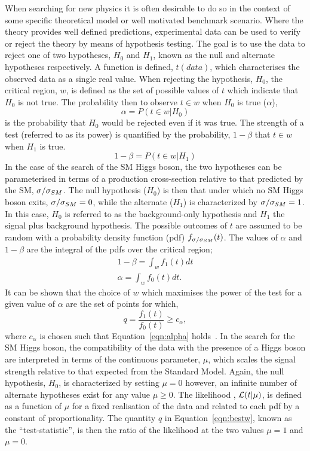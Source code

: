 When searching for new physics it is often desirable to do so in the context of
some specific theoretical model or well motivated benchmark scenario.
Where the theory provides well defined predictions,
experimental data can be used to verify or reject the theory
by means of hypothesis testing. The goal is to use the data 
to reject one of two hypotheses,
$H_{0}$ and $H_{1}$, known as the null and alternate hypotheses
respectively. A function is defined, $t(data)$,
which characterises the observed data as a single real value. When rejecting 
the hypothesis, $H_{0}$, the critical
region, $w$, is defined as the set of possible values of $t$
which indicate that $H_{0}$ is not true. The probability then 
to observe $t\in w$ when $H_{0}$ is true ($\alpha$), 
\begin{equation}
\alpha = P(t\in w|H_{0})
\end{equation}
is the probability that $H_{0}$ would be rejected even if it was true.
The strength of a test (referred to as its power) is quantified by 
the probability, $1-\beta$ that $t \in  w$ when $H_{1}$ is true.
\begin{equation}
1-\beta = P(t\in w|H_{1})
\end{equation}
In the case of the search of the SM Higgs boson, the two hypotheses
can be parameterised in terms of a production cross-section relative
to that predicted by the SM, $\sigma/\sigma_{SM}$.  
The null hypothesis ($H_{0}$) is then that under which no SM Higgs boson exits,
$\sigma/\sigma_{SM}=0$, while the alternate ($H_{1}$) is characterized by $\sigma/\sigma_{SM}=1$.
In this case, $H_{0}$ is referred to as the background-only hypothesis
and $H_{1}$ the signal plus background hypothesis.
The possible outcomes of $t$ are assumed to be random with a probability density
function (pdf) $f_{\sigma/\sigma_{SM}}(t)$. The values of $\alpha$ and $1-\beta$ are the integral of the pdfs
over the critical region;
\begin{eqnarray}
1-\beta =  \int_{w}f_{1}(t)dt\\ 
\alpha =  \int_{w}f_{0}(t)dt.
\label{eqn:alpha}
\end{eqnarray}
It can be shown that the choice of $w$ which maximises the power of the test for 
a given value of $\alpha$ are the set of points for which,
\begin{equation} 
	q = \frac {\displaystyle f_{1}(t)}{\displaystyle f_{0}(t)} \ge c_{\alpha},
\label{eqn:bestw}
\end{equation}
where $c_{\alpha}$ is chosen such that Equation~\ref{eqn:alpha} holds~\citep{statsbook}.
In the search for the SM Higgs boson, the compatibility of the data
with the presence of a Higgs boson are interpreted in terms of the 
continuous parameter, $\mu$, which scales the signal strength relative to that expected
from the Standard Model. 
Again, the null hypothesis, $H_{0}$, is characterized by setting $\mu=0$ however,
an infinite number of alternate hypotheses exist for any value $\mu \ge 0$.
The likelihood , $\mathcal{L}(t|\mu)$, is defined as a function of $\mu$ for a fixed 
realisation of the data and related to each pdf by a constant of proportionality.
The quantity $q$ in Equation~\ref{eqn:bestw}, known as the ``test-statistic'', is then
the ratio of the likelihood at the two values $\mu=1$ and $\mu=0$. 

